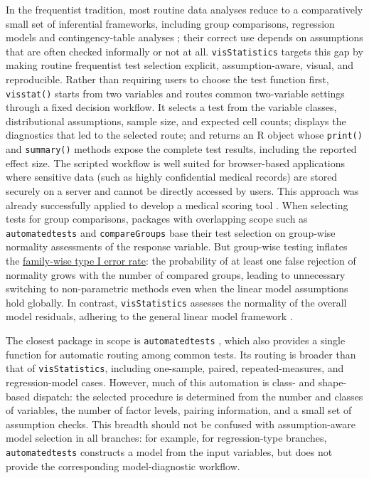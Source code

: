 In the frequentist tradition, most routine data analyses reduce to a comparatively small set of
inferential frameworks, including group comparisons, regression models and contingency-table
analyses \citep[\citet{Hayat:2017}, \citet{Sato:2017}, \citet{Brodeur:2020}]{Angrist:2009}; their correct use depends on assumptions that are often checked informally or not at all. \texttt{visStatistics} targets this gap by making routine frequentist test selection explicit, assumption-aware, visual, and reproducible.
Rather than requiring users to choose the test function first,
\texttt{visstat()} starts from two variables and routes common two-variable
settings through a fixed decision workflow. It selects a test from the
variable classes, distributional assumptions, sample size, and expected
cell counts; displays the diagnostics that led to the selected route;
and returns an R object whose \texttt{print()} and \texttt{summary()} methods expose
the complete test results, including the reported effect size. The
scripted workflow is well suited for browser-based applications where
sensitive data (such as highly confidential medical records) are stored
securely on a server and cannot be directly accessed by users. This
approach was already successfully applied to develop a medical scoring
tool \citep{Bijlenga:2017}. When selecting tests for group comparisons,
packages with overlapping scope such as \texttt{automatedtests} \citep{Zeevat:2025}
and \texttt{compareGroups} \citep{Subirana:2014} base their test selection on
group‑wise normality assessments of the response variable. But
group-wise testing inflates the \hyperref[post-hoc-analysis]{family-wise type I error
rate}: the probability of at least one false
rejection of normality grows with the number of compared groups, leading
to unnecessary switching to non-parametric methods even when the linear
model assumptions hold globally. In contrast, \texttt{visStatistics} assesses
the normality of the overall model residuals, adhering to the general
linear model framework \citep{Searle:1971}.

The closest package in scope is \texttt{automatedtests} \citep{Zeevat:2025}, which
also provides a single function for automatic routing among common tests.
Its routing is broader than that of \texttt{visStatistics}, including
one-sample, paired, repeated-measures, and regression-model cases.
However, much of this automation is class- and shape-based dispatch: the
selected procedure is determined from the number and classes of
variables, the number of factor levels, pairing information, and a small
set of assumption checks. This breadth should not be confused with
assumption-aware model selection in all branches: for example, for
regression-type branches, \texttt{automatedtests} constructs a model from the
input variables, but does not provide the corresponding model-diagnostic
workflow.

